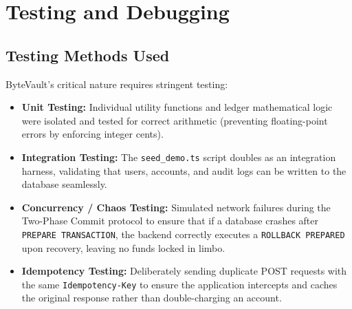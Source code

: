 \chapter{Testing and Debugging}

\section{Testing Methods Used}
ByteVault's critical nature requires stringent testing:
\begin{itemize}
    \item \textbf{Unit Testing:} Individual utility functions and ledger mathematical logic were isolated and tested for correct arithmetic (preventing floating-point errors by enforcing integer cents).
    \item \textbf{Integration Testing:} The \texttt{seed\_demo.ts} script doubles as an integration harness, validating that users, accounts, and audit logs can be written to the database seamlessly.
    \item \textbf{Concurrency / Chaos Testing:} Simulated network failures during the Two-Phase Commit protocol to ensure that if a database crashes after \texttt{PREPARE TRANSACTION}, the backend correctly executes a \texttt{ROLLBACK PREPARED} upon recovery, leaving no funds locked in limbo.
    \item \textbf{Idempotency Testing:} Deliberately sending duplicate POST requests with the same \texttt{Idempotency-Key} to ensure the application intercepts and caches the original response rather than double-charging an account.
\end{itemize}
